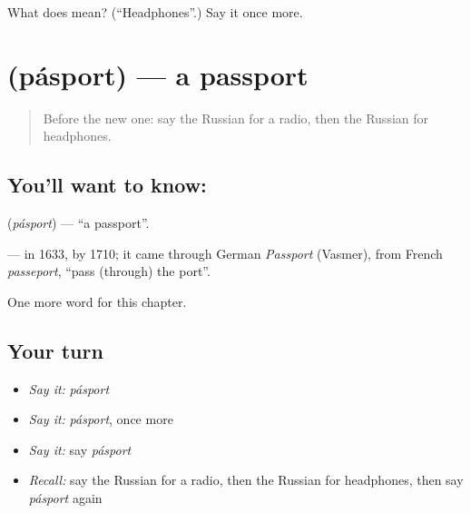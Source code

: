 \begin{tcolorbox}[breakable,colback=teal!4,colframe=teal!35!black,title={Before you move on}]
What does  mean? (\textquotedblleft{}Headphones\textquotedblright{}.) Say it once more.
\end{tcolorbox}
\section[\texorpdfstring{\ru{паспорт} (pásport)}{паспорт (pásport)}]{ (pásport) — a passport}

\label{lesson:RU-C247-pasport}



\begin{quote}
Before the new one: say the Russian for a radio, then the Russian for headphones.
\end{quote}

\subsection*{You'll want to know: }
\textbf{} (\emph{pásport}) — \textquotedblleft{}a passport\textquotedblright{}.

\begin{cousinweb}
\textbf{} — \emph{} in 1633, \emph{} by 1710; it came through German \emph{Passport} (Vasmer), from French \emph{passeport}, \textquotedblleft{}pass (through) the port\textquotedblright{}.
\end{cousinweb}

\begin{grammarlens}[title={What you've built}]
One more word for this chapter.
\end{grammarlens}

\subsection*{Your turn}
\begin{itemize}
\raggedright
  \item \emph{Say it:} \emph{pásport}
  \item \emph{Say it:} \emph{pásport}, once more
  \item \emph{Say it:} say \emph{pásport}
  \item \emph{Recall:} say the Russian for a radio, then the Russian for headphones, then say \emph{pásport} again
\end{itemize}

